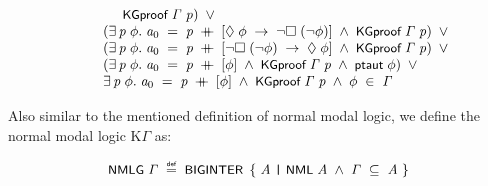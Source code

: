 \documentclass{report}
\renewcommand{\HOLConst}[1]{{\textsf{\upshape\small #1}}}
\newenvironment{holmath}{\begin{displaymath}\begin{array}{l}}{\end{array}\end{displaymath}\ignorespacesafterend}
\begin{document}
\begin{holmath}
\;\;\;\;\;\;\;\;\;\;\;\;\;\;\HOLConst{KGproof}\;\HOLFreeVar{\ensuremath{\Gamma}}\;\HOLBoundVar{p})\;\HOLSymConst{\HOLTokenDisj{}}\\
\;\;\;\;\;\;\;\;\;(\HOLSymConst{\HOLTokenExists{}}\HOLBoundVar{p}\;\HOLBoundVar{\ensuremath{\phi}}.\;\HOLFreeVar{a\sb{\mathrm{0}}}\;\HOLSymConst{=}\;\HOLBoundVar{p}\;\HOLSymConst{\HOLTokenDoublePlus}\;[\HOLSymConst{\ensuremath{\Diamond}}\;\HOLBoundVar{\ensuremath{\phi}}\;\HOLSymConst{\ensuremath{\rightarrow}}\;\HOLSymConst{\HOLTokenNeg{}}\HOLSymConst{\ensuremath{\Box}}\;(\HOLSymConst{\HOLTokenNeg{}}\HOLBoundVar{\ensuremath{\phi}})]\;\HOLSymConst{\HOLTokenConj{}}\;\HOLConst{KGproof}\;\HOLFreeVar{\ensuremath{\Gamma}}\;\HOLBoundVar{p})\;\HOLSymConst{\HOLTokenDisj{}}\\
\;\;\;\;\;\;\;\;\;(\HOLSymConst{\HOLTokenExists{}}\HOLBoundVar{p}\;\HOLBoundVar{\ensuremath{\phi}}.\;\HOLFreeVar{a\sb{\mathrm{0}}}\;\HOLSymConst{=}\;\HOLBoundVar{p}\;\HOLSymConst{\HOLTokenDoublePlus}\;[\HOLSymConst{\HOLTokenNeg{}}\HOLSymConst{\ensuremath{\Box}}\;(\HOLSymConst{\HOLTokenNeg{}}\HOLBoundVar{\ensuremath{\phi}})\;\HOLSymConst{\ensuremath{\rightarrow}}\;\HOLSymConst{\ensuremath{\Diamond}}\;\HOLBoundVar{\ensuremath{\phi}}]\;\HOLSymConst{\HOLTokenConj{}}\;\HOLConst{KGproof}\;\HOLFreeVar{\ensuremath{\Gamma}}\;\HOLBoundVar{p})\;\HOLSymConst{\HOLTokenDisj{}}\\
\;\;\;\;\;\;\;\;\;(\HOLSymConst{\HOLTokenExists{}}\HOLBoundVar{p}\;\HOLBoundVar{\ensuremath{\phi}}.\;\HOLFreeVar{a\sb{\mathrm{0}}}\;\HOLSymConst{=}\;\HOLBoundVar{p}\;\HOLSymConst{\HOLTokenDoublePlus}\;[\HOLBoundVar{\ensuremath{\phi}}]\;\HOLSymConst{\HOLTokenConj{}}\;\HOLConst{KGproof}\;\HOLFreeVar{\ensuremath{\Gamma}}\;\HOLBoundVar{p}\;\HOLSymConst{\HOLTokenConj{}}\;\HOLConst{ptaut}\;\HOLBoundVar{\ensuremath{\phi}})\;\HOLSymConst{\HOLTokenDisj{}}\\
\;\;\;\;\;\;\;\;\;\HOLSymConst{\HOLTokenExists{}}\HOLBoundVar{p}\;\HOLBoundVar{\ensuremath{\phi}}.\;\HOLFreeVar{a\sb{\mathrm{0}}}\;\HOLSymConst{=}\;\HOLBoundVar{p}\;\HOLSymConst{\HOLTokenDoublePlus}\;[\HOLBoundVar{\ensuremath{\phi}}]\;\HOLSymConst{\HOLTokenConj{}}\;\HOLConst{KGproof}\;\HOLFreeVar{\ensuremath{\Gamma}}\;\HOLBoundVar{p}\;\HOLSymConst{\HOLTokenConj{}}\;\HOLBoundVar{\ensuremath{\phi}}\;\HOLSymConst{\HOLTokenIn{}}\;\HOLFreeVar{\ensuremath{\Gamma}}
\end{holmath}

Also similar to the mentioned definition of normal modal logic, we define the normal modal logic K$\Gamma$ as:

\begin{holmath}
  \HOLConst{NMLG}\;\HOLFreeVar{\ensuremath{\Gamma}}\;\HOLSymConst{\HOLTokenDefEquality{}}\;\HOLConst{BIGINTER}\;\HOLTokenLeftbrace{}\HOLBoundVar{A}\;\HOLTokenBar{}\;\HOLConst{NML}\;\HOLBoundVar{A}\;\HOLSymConst{\HOLTokenConj{}}\;\HOLFreeVar{\ensuremath{\Gamma}}\;\HOLSymConst{\HOLTokenSubset{}}\;\HOLBoundVar{A}\HOLTokenRightbrace{}
\end{holmath}
\end{document}
